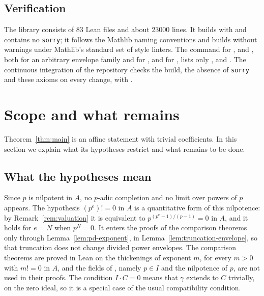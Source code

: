 \documentclass[11pt]{amsart}
\theoremstyle{plain}
\theoremstyle{definition}
\theoremstyle{remark}
\begin{document}
\subsection{Verification}

The library consists of 83 Lean files and about 23000 lines. It builds with  and contains no \texttt{sorry}; it follows the Mathlib naming conventions and builds without warnings under Mathlib's standard set of style linters. The command  for ,  and , both for an arbitrary envelope family and for , and for , lists only ,  and . The continuous integration of the repository checks the build, the absence of \texttt{sorry} and these axioms on every change, with .

\section{Scope and what remains}\label{sec:scope}

Theorem~\ref{thm:main} is an affine statement with trivial coefficients. In this section we explain what its hypotheses restrict and what remains to be done.

\subsection{What the hypotheses mean}

Since $p$ is nilpotent in $A$, no $p$-adic completion and no limit over powers of $p$ appears. The hypothesis $(p^e)! = 0$ in $A$ is a quantitative form of this nilpotence: by Remark~\ref{rem:valuation} it is equivalent to $p^{(p^e-1)/(p-1)} = 0$ in $A$, and it holds for $e = N$ when $p^N = 0$. It enters the proofs of the comparison theorems only through Lemma~\ref{lem:pd-exponent}, in Lemma~\ref{lem:truncation-envelope}, so that truncation does not change divided power envelopes. The comparison theorems are proved in Lean on the thickenings of exponent $m$, for every $m > 0$ with $m! = 0$ in $A$, and the fields of , namely $p \in I$ and the nilpotence of $p$, are not used in their proofs. The condition $I \cdot C = 0$ means that $\gamma$ extends to $C$ trivially, on the zero ideal, so it is a special case of the usual compatibility condition.
\end{document}
